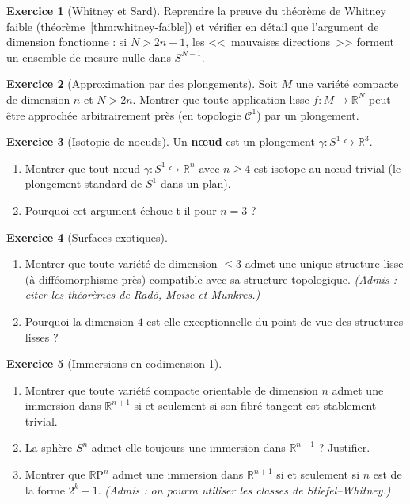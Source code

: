 \documentclass[12pt,a4paper,openany]{book}
\theoremstyle{definition}
\newtheorem{exercice}{Exercice}[chapter]
\theoremstyle{plain}
\theoremstyle{remark}
\newcommand{\R}{\mathbb{R}}
\newcommand{\RP}{\mathbb{R}\mathrm{P}}
\begin{document}
\begin{exercice}[Whitney et Sard]\label{exo:whitney-6}
Reprendre la preuve du théorème de Whitney faible (théorème~\ref{thm:whitney-faible})
et vérifier en détail que l'argument de dimension fonctionne : si $N > 2n + 1$,
les <<~mauvaises directions~>> forment un ensemble de mesure nulle dans
$S^{N-1}$.
\end{exercice}

\begin{exercice}[Approximation par des plongements]\label{exo:whitney-7}
Soit $M$ une variété compacte de dimension $n$ et $N > 2n$. Montrer que toute
application lisse $f : M \to \R^N$ peut être approchée arbitrairement près (en
topologie $\mathcal{C}^1$) par un plongement.
\end{exercice}

\begin{exercice}[Isotopie de noeuds]\label{exo:whitney-8}
Un \textbf{n\oe ud} est un plongement $\gamma : S^1 \hookrightarrow \R^3$.
\begin{enumerate}[label=(\alph*)]
  \item Montrer que tout n\oe ud $\gamma : S^1 \hookrightarrow \R^n$ avec
    $n \geqslant 4$ est isotope au n\oe ud trivial (le plongement standard de
    $S^1$ dans un plan).
  \item Pourquoi cet argument échoue-t-il pour $n = 3$ ?
\end{enumerate}
\end{exercice}

\begin{exercice}[Surfaces exotiques]\label{exo:whitney-9}
\begin{enumerate}[label=(\alph*)]
  \item Montrer que toute variété de dimension $\leqslant 3$ admet une unique
    structure lisse (à difféomorphisme près) compatible avec sa structure
    topologique.
    \emph{(Admis : citer les théorèmes de Radó, Moise et Munkres.)}
  \item Pourquoi la dimension $4$ est-elle exceptionnelle du point de vue des
    structures lisses ?
\end{enumerate}
\end{exercice}

\begin{exercice}[Immersions en codimension 1]\label{exo:whitney-10}
\begin{enumerate}[label=(\alph*)]
  \item Montrer que toute variété compacte orientable de dimension $n$ admet une
    immersion dans $\R^{n+1}$ si et seulement si son fibré tangent est stablement
    trivial.
  \item La sphère $S^n$ admet-elle toujours une immersion dans $\R^{n+1}$ ?
    Justifier.
  \item Montrer que $\RP^n$ admet une immersion dans $\R^{n+1}$ si et seulement
    si $n$ est de la forme $2^k - 1$.
    \emph{(Admis : on pourra utiliser les classes de Stiefel--Whitney.)}
\end{enumerate}
\end{exercice}
\end{document}
